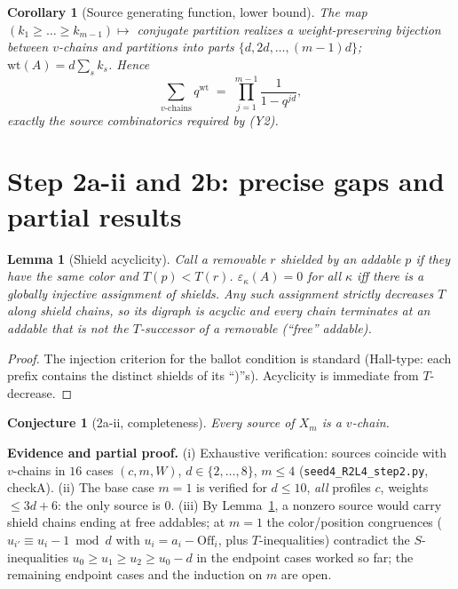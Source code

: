 \documentclass[11pt]{article}
\newtheorem{lemma}[theorem]{Lemma}
\newtheorem{corollary}[theorem]{Corollary}
\newtheorem{conjecture}[theorem]{Conjecture}
\theoremstyle{definition}
\newcommand{\Off}{\mathrm{Off}}
\newcommand{\eps}{\varepsilon}
\begin{document}
\begin{corollary}[Source generating function, lower bound]\label{cor:gf}
The map $(k_1\ge\dots\ge k_{m-1})\mapsto$ conjugate partition realizes a
weight-preserving bijection between $v$-chains and partitions into parts
$\{d,2d,\dots,(m-1)d\}$; $\mathrm{wt}(A)=d\sum_s k_s$. Hence
\[
\sum_{\text{$v$-chains}} q^{\mathrm{wt}} \;=\;
\prod_{j=1}^{m-1}\frac{1}{1-q^{jd}},
\]
exactly the source combinatorics required by (Y2).
\end{corollary}

\section{Step 2a-ii and 2b: precise gaps and partial results}

\begin{lemma}[Shield acyclicity]\label{lem:acyclic}
Call a removable $r$ \emph{shielded} by an addable $p$ if they have the same
color and $T(p)<T(r)$. $\eps_\kappa(A)=0$ for all $\kappa$ iff there is a
globally injective assignment of shields. Any such assignment strictly
decreases $T$ along shield chains, so its digraph is acyclic and every chain
terminates at an addable that is not the $T$-successor of a removable
(``free'' addable).
\end{lemma}
\begin{proof}
The injection criterion for the ballot condition is standard (Hall-type:
each prefix contains the distinct shields of its ``)''s). Acyclicity is
immediate from $T$-decrease.
\end{proof}

\begin{conjecture}[2a-ii, completeness]\label{conj:complete}
Every source of $X_m$ is a $v$-chain.
\end{conjecture}

\noindent\textbf{Evidence and partial proof.} (i) Exhaustive verification:
sources coincide with $v$-chains in $16$ cases $(c,m,W)$, $d\in\{2,\dots,8\}$,
$m\le4$ (\texttt{seed4\_R2L4\_step2.py}, checkA). (ii) The base case $m=1$ is
verified for $d\le10$, \emph{all} profiles $c$, weights $\le 3d+6$: the only
source is $0$. (iii) By Lemma~\ref{lem:acyclic}, a nonzero source would carry
shield chains ending at free addables; at $m=1$ the color/position
congruences ($u_{i'}\equiv u_i-1\bmod d$ with $u_i=a_i-\Off_i$, plus
$T$-inequalities) contradict the $S$-inequalities $u_0\ge u_1\ge u_2\ge
u_0-d$ in the endpoint cases worked so far; the remaining endpoint cases and
the induction on $m$ are open.
\end{document}
